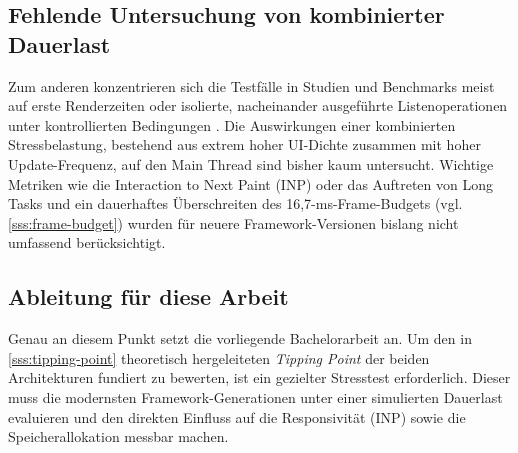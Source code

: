 \subsection{Fehlende Untersuchung von kombinierter Dauerlast}
Zum anderen konzentrieren sich die Testfälle in Studien und Benchmarks meist auf erste Renderzeiten oder isolierte, nacheinander ausgeführte Listenoperationen unter kontrollierten Bedingungen \cite{krause-benchmark-2026, levlin-dom-benchmark-2020, putra-performance-2025, ollila-rendering_performance-2022}. Die Auswirkungen einer kombinierten Stressbelastung, bestehend aus extrem hoher UI-Dichte zusammen mit hoher Update-Frequenz, auf den Main Thread sind bisher kaum untersucht. Wichtige Metriken wie die Interaction to Next Paint (INP) oder das Auftreten von Long Tasks und ein dauerhaftes Überschreiten des 16,7-ms-Frame-Budgets (vgl. \cref{sss:frame-budget}) wurden für neuere Framework-Versionen bislang nicht umfassend berücksichtigt.

\subsection{Ableitung für diese Arbeit}
Genau an diesem Punkt setzt die vorliegende Bachelorarbeit an. Um den in \cref{sss:tipping-point} theoretisch hergeleiteten \textit{Tipping Point} der beiden Architekturen fundiert zu bewerten, ist ein gezielter Stresstest erforderlich. Dieser muss die modernsten Framework-Generationen unter einer simulierten Dauerlast evaluieren und den direkten Einfluss auf die Responsivität (INP) sowie die Speicherallokation messbar machen.